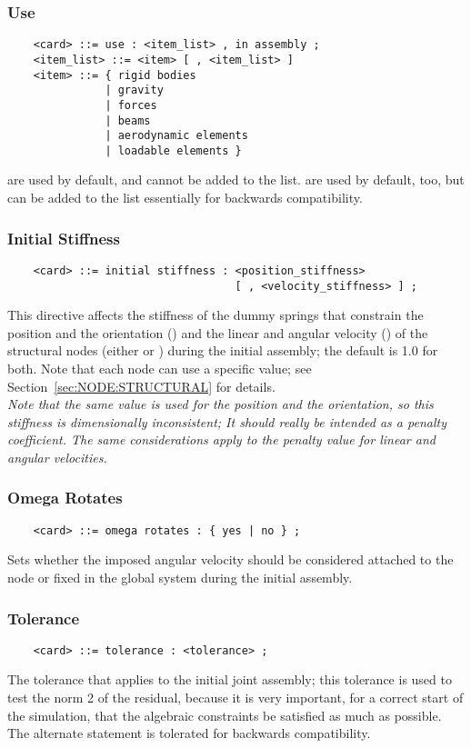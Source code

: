 \subsubsection{Use}\label{sec:CONTROLDATA:USE}
\begin{verbatim}
    <card> ::= use : <item_list> , in assembly ;
    <item_list> ::= <item> [ , <item_list> ]
    <item> ::= { rigid bodies 
               | gravity
               | forces
               | beams
               | aerodynamic elements
               | loadable elements } 
\end{verbatim}
 are used by default, and cannot be added to the list.
 are used by default, too, but can be added to the list
essentially for backwards compatibility.

\subsubsection{Initial Stiffness}\label{sec:CONTROLDATA:INITIALSTIFFNESS}
\begin{verbatim}
    <card> ::= initial stiffness : <position_stiffness>
                                   [ , <velocity_stiffness> ] ;
\end{verbatim}
This directive affects the stiffness of the dummy springs that constrain
the position and the orientation ()
and the linear and angular velocity ()
of the structural nodes (either  or ) 
during the initial assembly; the default is 1.0 for both.
Note that each node can use a specific value; 
see Section~\ref{sec:NODE:STRUCTURAL} for details. \\
\emph{Note that the same value is used for the position and the orientation,
so this stiffness is dimensionally inconsistent; It should really 
be intended as a penalty coefficient.
The same considerations apply to the penalty value for linear 
and angular velocities.}

\subsubsection{Omega Rotates}
\begin{verbatim}
    <card> ::= omega rotates : { yes | no } ;
\end{verbatim}
Sets whether the imposed angular velocity should be considered attached 
to the node or fixed in the global system during the initial assembly.

\subsubsection{Tolerance}
\begin{verbatim}
    <card> ::= tolerance : <tolerance> ;
\end{verbatim}
The tolerance that applies to the initial joint assembly; 
this tolerance is used to test the norm 2 of the residual,
because it is very important, for a correct start of the simulation,
that the algebraic constraints be satisfied as much as possible.
The alternate statement  is tolerated 
for backwards compatibility.

